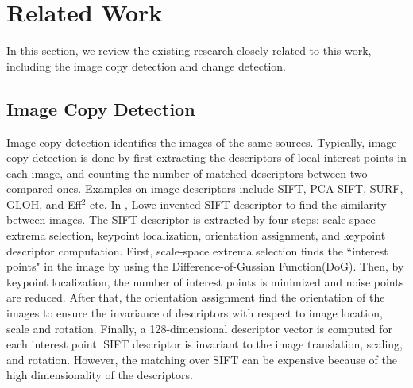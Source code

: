 \documentclass[runningheads,a4paper]{llncs}
\begin{document}
\section{Related Work}\label{sec-bg}

In this section, we review the existing research closely related to this work, including the image copy detection and change detection.

\subsection{Image Copy Detection} \label{sec:ImageCopyDetection}
Image copy detection identifies the images of the same sources. Typically, image copy detection is done by first extracting the descriptors of local interest points in each image, and counting the number of matched descriptors between two compared ones. Examples on image descriptors include SIFT\cite{790410}, PCA-SIFT\cite{1315206}, SURF\cite{bay2006surf}, GLOH\cite{10.1109/TPAMI.2005.188}, and Eff$^2$\cite{DBLP:conf/mm/LejsekAJA06a} etc. In \cite{790410}, Lowe invented SIFT descriptor to find the similarity between images. The SIFT descriptor is extracted by four steps: scale-space extrema selection, keypoint localization, orientation assignment, and keypoint descriptor computation. First, scale-space extrema selection finds the ``interest points" in the image by using the Difference-of-Gussian Function(DoG). Then, by keypoint localization, the number of interest points is minimized and noise points are reduced. After that, the orientation assignment find the orientation of the images to ensure the invariance of descriptors with respect to image location, scale and rotation. Finally, a 128-dimensional descriptor vector is computed for each interest point. SIFT descriptor is invariant to the image translation, scaling, and rotation. However, the matching over SIFT can be expensive because of the high dimensionality of the descriptors.
\end{document}
